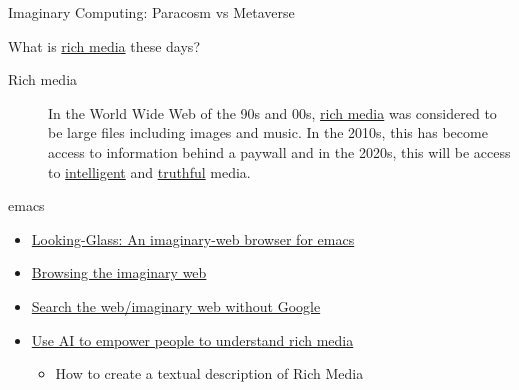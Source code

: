\documentclass[presentation]{beamer}
\begin{document}
\begin{frame}[label={sec:org2be8581}]{Imaginary Computing: Paracosm vs Metaverse}
\begin{block}{What is \uline{rich media} these days?}
\begin{description}
\item[{Rich media}] In the World Wide Web of the 90s and 00s, \uline{rich media}
was considered to be large files including
images and music. In the 2010s, this has become
access to information behind a paywall and in
the 2020s, this will be access to \uline{intelligent}
and \uline{truthful} media.
\end{description}
\end{block}

\begin{block}{emacs}
\begin{itemize}
\item \href{https://semiosis.github.io/looking-glass/}{Looking-Glass: An imaginary-web browser for emacs}
\item \href{https://mullikine.github.io/posts/the-imaginary-web-with-codex/}{Browsing the imaginary web}
\item \href{https://mullikine.github.io/posts/search-the-web-with-codex/}{Search the web/imaginary web without Google}
\item \href{https://mullikine.github.io/posts/alephalpha-for-alttext/}{Use AI to empower people to understand rich media}
\begin{itemize}
\item How to create a textual description of Rich Media
\end{itemize}
\end{itemize}
\end{block}
\end{frame}
\end{document}
